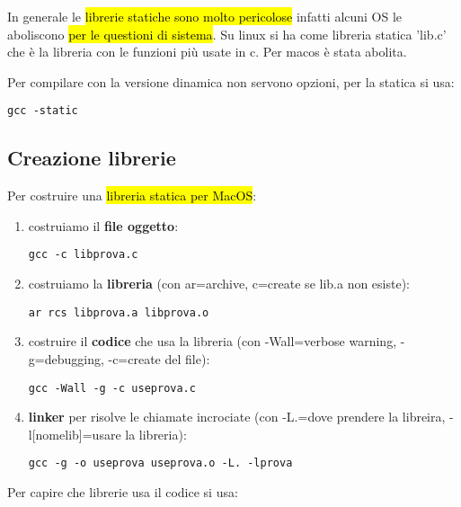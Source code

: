 In generale le \hl{librerie statiche sono molto pericolose} infatti alcuni OS le aboliscono \hl{per le questioni di sistema}. Su linux si ha come libreria statica 'lib.c' che è la libreria con le funzioni più usate in c. Per macos è stata abolita.

Per compilare con la versione dinamica non servono opzioni, per la statica si usa:

\begin{lstlisting}
gcc -static
\end{lstlisting}


\subsection{Creazione librerie}

Per costruire una \hl{libreria statica per MacOS}:

\begin{enumerate}
	\item costruiamo il \textbf{file oggetto}:

\begin{lstlisting}
gcc -c libprova.c
\end{lstlisting}
		
	\item costruiamo la \textbf{libreria} (con ar=archive, c=create se lib.a non esiste):

\begin{lstlisting}
ar rcs libprova.a libprova.o
\end{lstlisting}
			
	\item costruire il \textbf{codice} che usa la libreria (con -Wall=verbose warning, -g=debugging, -c=create del file):

\begin{lstlisting}
gcc -Wall -g -c useprova.c
\end{lstlisting}
	
	\item \textbf{linker} per risolve le chiamate incrociate (con -L.=dove prendere la libreira, -l[nomelib]=usare la libreria):

\begin{lstlisting}
gcc -g -o useprova useprova.o -L. -lprova 
\end{lstlisting}

\end{enumerate}

Per capire che librerie usa il codice si usa:

